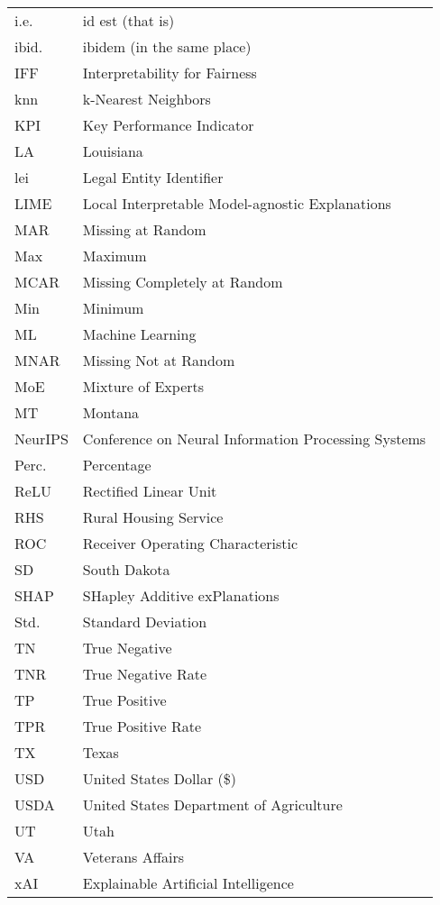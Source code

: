 \documentclass[
	12pt, 
	a4paper, 
	oneside,
	parskip=half*, %
	openany,  %
	listof=totoc, %
	bibliography=totoc, %
	index=totoc, %
  toc=chapterentrywithdots, %
  numbers=noenddot, %
]{scrbook}
\begin{document}
\begin{longtable}{ll}
i.e. & id est (that is) \\
ibid. & ibidem (in the same place) \\
IFF & Interpretability for Fairness \\
knn & k-Nearest Neighbors \\
KPI & Key Performance Indicator \\
LA & Louisiana \\
lei & Legal Entity Identifier \\
LIME & Local Interpretable Model-agnostic Explanations \\
MAR & Missing at Random \\
Max & Maximum \\
MCAR & Missing Completely at Random \\
Min & Minimum \\
ML & Machine Learning \\
MNAR & Missing Not at Random \\
MoE & Mixture of Experts \\
MT & Montana \\
NeurIPS & Conference on Neural Information Processing Systems \\
Perc. & Percentage \\
ReLU & Rectified Linear Unit \\
RHS & Rural Housing Service \\
ROC & Receiver Operating Characteristic \\
SD & South Dakota \\
SHAP & SHapley Additive exPlanations \\
Std. & Standard Deviation \\
TN & True Negative \\
TNR & True Negative Rate \\
TP & True Positive \\
TPR & True Positive Rate \\
TX & Texas \\
USD & United States Dollar (\$) \\
USDA & United States Department of Agriculture \\
UT & Utah \\
VA & Veterans Affairs \\
xAI & Explainable Artificial Intelligence \\
\end{longtable}




\mainmatter
\setcounter{page}{1}






\printbibliography
\end{document}
